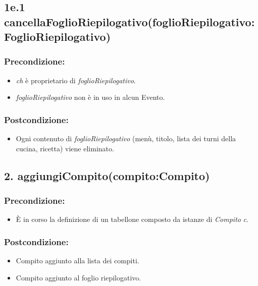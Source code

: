 \subsection*{1e.1 cancellaFoglioRiepilogativo(foglioRiepilogativo:FoglioRiepilogativo)}

\subsubsection*{Precondizione:}
\begin{itemize}
    \item \textit{ch} è proprietario di \textit{foglioRiepilogativo}.
    \item \textit{foglioRiepilogativo} non è in uso in alcun Evento.
\end{itemize}

\subsubsection*{Postcondizione:}
\begin{itemize}
    \item Ogni contenuto di \textit{foglioRiepilogativo} (menù, titolo, lista dei turni della cucina, ricetta) viene eliminato.
\end{itemize}

\subsection*{2. aggiungiCompito(compito:Compito)}

\subsubsection*{Precondizione:}
\begin{itemize}
    \item È in corso la definizione di un tabellone composto da istanze di \textit{Compito} \textit{c}.
\end{itemize}

\subsubsection*{Postcondizione:}
\begin{itemize}
    \item Compito aggiunto alla lista dei compiti.
    \item Compito aggiunto al foglio riepilogativo.
\end{itemize}

